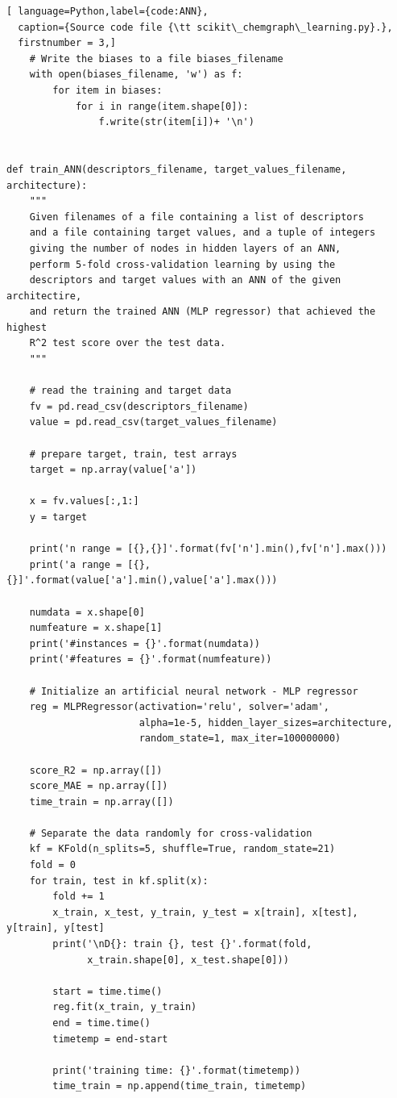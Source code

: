 \documentclass[11pt,titlepage,dvipdfmx,twoside]{article}
\begin{document}
\begin{lstlisting}[ language=Python,label={code:ANN},
  caption={Source code file {\tt scikit\_chemgraph\_learning.py}.},
  firstnumber = 3,]
    # Write the biases to a file biases_filename
    with open(biases_filename, 'w') as f:
        for item in biases:
            for i in range(item.shape[0]):
                f.write(str(item[i])+ '\n')
    

def train_ANN(descriptors_filename, target_values_filename, architecture):
    """
    Given filenames of a file containing a list of descriptors
    and a file containing target values, and a tuple of integers
    giving the number of nodes in hidden layers of an ANN,
    perform 5-fold cross-validation learning by using the 
    descriptors and target values with an ANN of the given architectire,
    and return the trained ANN (MLP regressor) that achieved the highest
    R^2 test score over the test data.
    """
    
    # read the training and target data
    fv = pd.read_csv(descriptors_filename) 
    value = pd.read_csv(target_values_filename)       
    
    # prepare target, train, test arrays
    target = np.array(value['a'])
    
    x = fv.values[:,1:]
    y = target
    
    print('n range = [{},{}]'.format(fv['n'].min(),fv['n'].max()))
    print('a range = [{},{}]'.format(value['a'].min(),value['a'].max()))
    
    numdata = x.shape[0]
    numfeature = x.shape[1]
    print('#instances = {}'.format(numdata))
    print('#features = {}'.format(numfeature))
    
    # Initialize an artificial neural network - MLP regressor
    reg = MLPRegressor(activation='relu', solver='adam',
                       alpha=1e-5, hidden_layer_sizes=architecture,
                       random_state=1, max_iter=100000000)
    
    score_R2 = np.array([])
    score_MAE = np.array([])
    time_train = np.array([])
    
    # Separate the data randomly for cross-validation
    kf = KFold(n_splits=5, shuffle=True, random_state=21)
    fold = 0
    for train, test in kf.split(x):
        fold += 1
        x_train, x_test, y_train, y_test = x[train], x[test], y[train], y[test]
        print('\nD{}: train {}, test {}'.format(fold, 
              x_train.shape[0], x_test.shape[0]))
    
        start = time.time()
        reg.fit(x_train, y_train)
        end = time.time()
        timetemp = end-start
        
        print('training time: {}'.format(timetemp))
        time_train = np.append(time_train, timetemp)
    

\end{lstlisting}
\end{document}
